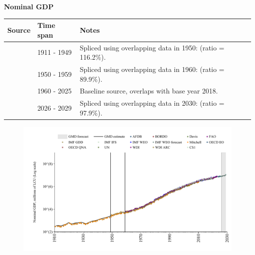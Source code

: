 \documentclass[12pt,a4paper,landscape]{article}
\begin{document}
\begin{adjustbox}{max totalsize={\paperwidth}{\paperheight},center}
\begin{minipage}[t][\textheight][t]{\textwidth}
\vspace*{0.5cm}
{}
\begin{center}
{\Large\bfseries Nominal GDP}
\end{center}
\vspace{0.5cm}
\begin{table}[H]
\centering
\small
\begin{tabular}{|l|l|l|}
\hline
\textbf{Source} & \textbf{Time span} & \textbf{Notes} \\
\hline
\rowcolor{white}\cite{Mitchell}& 1911 - 1949 &Spliced using overlapping data in 1950: (ratio = 116.2\%). \\
\rowcolor{lightgray}\cite{IMF_GDD}& 1950 - 1959 &Spliced using overlapping data in 1960: (ratio = 89.9\%). \\
\rowcolor{white}\cite{OECD_EO}& 1960 - 2025 &Baseline source, overlaps with base year 2018. \\
\rowcolor{lightgray}\cite{IMF_WEO_forecast}& 2026 - 2029 &Spliced using overlapping data in 2030: (ratio = 97.9\%). \\
\hline
\end{tabular}
\end{table}
\begin{figure}[H]
\centering
\includegraphics[width=\textwidth,height=0.6\textheight,keepaspectratio]{graphs/ZAF_nGDP.pdf}
\end{figure}
\end{minipage}
\end{adjustbox}
\end{document}
